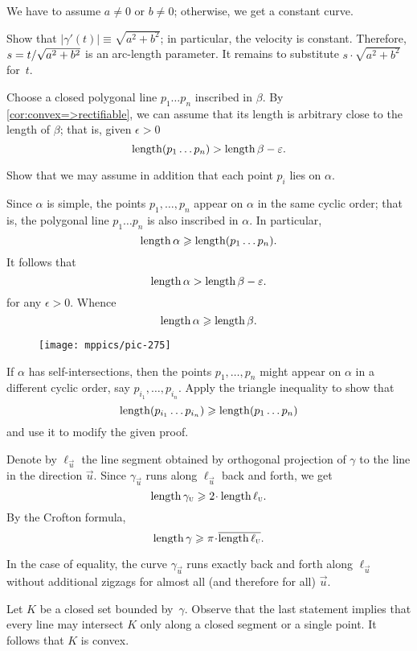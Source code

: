 \begin{multicols}{2}
We have to assume $a\ne 0$ or $b\ne0$;
otherwise, we get a constant curve.

Show that $|\gamma'(t)|\equiv \sqrt{a^2+b^2}$;
in particular, the velocity is constant.
Therefore, $s\z=t/\sqrt{a^2+b^2}$ is an arc-length parameter.
It remains to substitute $s\cdot \sqrt{a^2+b^2}$ for~$t$.




Choose a closed polygonal line $p_1\dots p_n$ inscribed in $\beta$.
By \ref{cor:convex=>rectifiable}, we can assume that its length is arbitrary close to the length of $\beta$;
that is, given $\epsilon>0$ 
\[\mathop{\rm length}\nolimits (p_1\dots p_n)>\mathop{\rm length}\nolimits\beta-\varepsilon.\]

Show that we may assume in addition that each point $p_i$ lies on $\alpha$.

Since $\alpha$ is simple, the points $p_1,\dots,p_n$ appear on $\alpha$ in the same cyclic order;
that is, the polygonal line $p_1\dots p_n$ is also inscribed in $\alpha$.
In particular,
\[\mathop{\rm length}\nolimits\alpha\geqslant \mathop{\rm length}\nolimits (p_1\dots p_n).\]
It follows that 
\[\mathop{\rm length}\nolimits\alpha>\mathop{\rm length}\nolimits\beta-\varepsilon.\]
for any $\epsilon>0$.
Whence 
\[\mathop{\rm length}\nolimits\alpha\geqslant\mathop{\rm length}\nolimits\beta.\]

\begin{wrapfigure}{r}{25 mm}
\vskip-6mm
\centering
\texttt{[image: mppics/pic-275]}
\vskip0mm
\end{wrapfigure}

If $\alpha$ has self-intersections, then the points $p_1,\dots, p_n$ might appear on $\alpha$ in a different cyclic order, say $p_{i_1},\dots,p_{i_n}$.
Apply the triangle inequality to show that 
\[\mathop{\rm length}\nolimits(p_{i_1}\dots p_{i_n})\geqslant \mathop{\rm length}\nolimits (p_1\dots p_n)\]
and use it to modify the given proof.



Denote by $\ell_{\vec u}$ the line segment 
obtained by orthogonal projection of $\gamma$ to the line in the direction ${\vec u}$.
Since $\gamma_{\vec u}$ runs along $\ell_{\vec u}$ back and forth, we get 
\[\length\gamma_{\vec u}\ge 2\cdot\length\ell_{\vec u}.\]
By the Crofton formula, 
\[\length\gamma\ge \pi\cdot \overline{\length\ell_{\vec u}}.\]

In the case of equality, the curve $\gamma_{\vec u}$ runs exactly back and forth along $\ell_{\vec u}$ without additional zigzags for almost all (and therefore for all) ${\vec u}$.

Let $K$ be a closed set bounded by~$\gamma$.
Observe that the last statement implies that every line may intersect $K$ only along a closed segment or a single point.
It follows that $K$ is convex.


\end{multicols}

